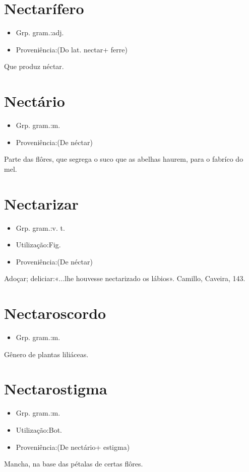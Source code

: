 \section{Nectarífero}
\begin{itemize}
\item {Grp. gram.:adj.}
\end{itemize}
\begin{itemize}
\item {Proveniência:(Do lat. \textunderscore nectar\textunderscore  + \textunderscore ferre\textunderscore )}
\end{itemize}
Que produz néctar.
\section{Nectário}
\begin{itemize}
\item {Grp. gram.:m.}
\end{itemize}
\begin{itemize}
\item {Proveniência:(De \textunderscore néctar\textunderscore )}
\end{itemize}
Parte das flôres, que segrega o suco que as abelhas haurem, para o fabríco do mel.
\section{Nectarizar}
\begin{itemize}
\item {Grp. gram.:v. t.}
\end{itemize}
\begin{itemize}
\item {Utilização:Fig.}
\end{itemize}
\begin{itemize}
\item {Proveniência:(De \textunderscore néctar\textunderscore )}
\end{itemize}
Adoçar; deliciar:«\textunderscore ...lhe houvesse nectarizado os lábios\textunderscore ». Camillo, \textunderscore Caveira\textunderscore , 143.
\section{Nectaroscordo}
\begin{itemize}
\item {Grp. gram.:m.}
\end{itemize}
Gênero de plantas liliáceas.
\section{Nectarostigma}
\begin{itemize}
\item {Grp. gram.:m.}
\end{itemize}
\begin{itemize}
\item {Utilização:Bot.}
\end{itemize}
\begin{itemize}
\item {Proveniência:(De \textunderscore nectário\textunderscore  + \textunderscore estigma\textunderscore )}
\end{itemize}
Mancha, na base das pétalas de certas flôres.
